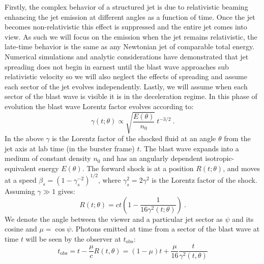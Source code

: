 \documentclass[twocolumn]{aastex62}
\newcommand{\tobs}{\ensuremath{t_{\mathrm{obs}}}}
\begin{document}
  Firstly, the complex behavior of a structured jet is due to relativistic beaming enhancing the jet emission at different angles as a function of time.  Once the jet becomes non-relativistic this effect is suppressed and the entire jet comes into view.  As such we will focus on the emission when the jet remains relativistic, the late-time behavior is the same as any Newtonian jet of comparable total energy.  Numerical simulations and analytic considerations have demonstrated that jet spreading does not begin in earnest until the blast wave approaches sub relativistic velocity so we will also neglect the effects of spreading and assume each sector of the jet evolves independently.  Lastly, we will assume when each sector of the blast wave is visible it is in the deceleration regime.  In this phase of evolution the blast wave Lorentz factor evolves according to:
  \begin{equation}
	\gamma(t; \theta) \propto \sqrt{\frac{E(\theta)}{n_0}}\ t^{-3/2}\ . \label{eq:lorentzEvolution}
\end{equation}
  In the above $\gamma$ is the Lorentz factor of the shocked fluid at an angle $\theta$ from the jet axis at lab time (in the burster frame) $t$.  The blast wave expands into a medium of constant density $n_0$ and has an angularly dependent isotropic-equivalent energy $E(\theta)$.  The forward shock is at a position $R(t; \theta)$, and moves at a speed $\beta_s = (1-\gamma_s^{-2})^{1/2}$, where $\gamma_s^2 = 2 \gamma^2$ is the Lorentz factor of the shock.  Assuming $\gamma \gg 1$ gives:
\begin{equation}
	R(t; \theta) = ct\left(1-\frac{1}{16 \gamma^2(t; \theta)}\right)\ .
\end{equation}
We denote the angle between the viewer and a particular jet sector as $\psi$ and its cosine and $\mu = \cos \psi$.  Photons emitted at time from a sector of the blast wave at time $t$ will be seen by the observer at $\tobs$:
\begin{equation}
	\tobs = t - \frac{\mu}{c} R(t,\theta) = (1-\mu)t + \frac{\mu}{16}\frac{t}{ \gamma^2(t,\theta)} \label{eq:tobs}
\end{equation}
\end{document}
